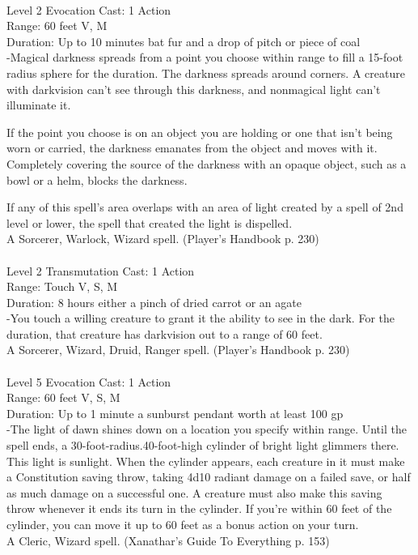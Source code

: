 \documentclass[10pt,twocolumn]{report}
\begin{document}
 \\
Level 2 \quad Evocation \quad Cast: 1 Action\\
Range: 60 feet \quad V, M\\
Duration: Up to 10 minutes \quad bat fur and a drop of pitch or piece of coal\\
-Magical darkness spreads from a point you choose within range to fill a 15-foot radius sphere for the duration.
The darkness spreads around corners. A creature with darkvision can’t see through this darkness, and nonmagical light can’t illuminate it. 

If the point you choose is on an object you are holding or one that isn’t being worn or carried, the darkness emanates from the object and moves with it. Completely covering the source of the darkness with an opaque object, such as a bowl or a helm, blocks the darkness.

If any of this spell’s area overlaps with an area of light created by a spell of 2nd level or lower, the spell that created the light is dispelled.\\
A Sorcerer, Warlock, Wizard spell. (Player's Handbook p. 230) \\


 \\
Level 2 \quad Transmutation \quad Cast: 1 Action\\
Range: Touch \quad V, S, M\\
Duration: 8 hours \quad either a pinch of dried carrot or an agate\\
-You touch a willing creature to grant it the ability to see in the dark.
For the duration, that creature has darkvision out to a range of 60 feet.\\
A Sorcerer, Wizard, Druid, Ranger spell. (Player's Handbook p. 230) \\


 \\
Level 5 \quad Evocation \quad Cast: 1 Action\\
Range: 60 feet \quad V, S, M\\
Duration: Up to 1 minute \quad a sunburst pendant worth at least 100 gp\\
-The light of dawn shines down on a location you specify within range. Until the spell ends, a 30-foot-radius.40-foot-high cylinder of bright light glimmers there. This light is sunlight. When the cylinder appears, each creature in it must make a Constitution saving throw, taking 4d10 radiant damage on a failed save, or half as much damage on a successful one. A creature must also make this saving throw whenever it ends its turn in the cylinder. If you’re within 60 feet of the cylinder, you can move it up to 60 feet as a bonus action on your turn.\\
A Cleric, Wizard spell. (Xanathar's Guide To Everything p. 153) \\
\end{document}
